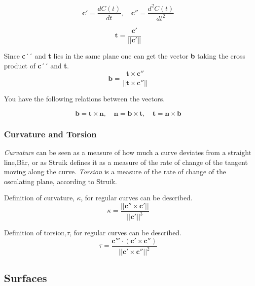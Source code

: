\begin{equation}
\textbf{c}' =  \frac{d C(t)}{dt}, \quad \textbf{c}''=   \frac{d^2 C(t)}{dt^2}
\end{equation}


\begin{equation}
\textbf{t} = \frac{\textbf{c}'}{||\textbf{c}'||} 
\end{equation}

Since \textbf{c}´´ and \textbf{t} lies in the same plane one can get the vector \textbf{b} taking the cross product of \textbf{c}´´ and \textbf{t}. 
\begin{equation}
\textbf{b} = \frac{\textbf{t} \times \textbf{c}''}{||\textbf{t} \times \textbf{c}''||} 
\end{equation}

You have the following relations between the vectors.

\begin{equation}
\textbf{b} = \textbf{t} \times \textbf{n} ,\quad \textbf{n} = \textbf{b} \times \textbf{t} ,\quad \textbf{t} = \textbf{n} \times \textbf{b} 
\end{equation}

\subsubsection{Curvature and Torsion} \label{curvature}

\textit{Curvature} can be seen as a measure of how much a curve deviates from a straight line,Bär, or as Struik defines it as a measure of the rate of change of the tangent moving along the curve. \textit{Torsion} is a measure of the rate of change of the osculating plane, according to Struik.

\vspace{5mm} %

Definition of curvature, $\kappa$, for regular curves can be described. 
\begin{equation}
\kappa = \frac{|| \textbf{c}'' \times \textbf{c}' ||}{||\textbf{c}'||^3} 
\end{equation}

Definition of torsion,$\tau$, for regular curves can be described. 
\begin{equation}
\tau = \frac{ \textbf{c}''' \cdot(\textbf{c}' \times \textbf{c}'')}{||\textbf{c}' \times \textbf{c}''||^2} 
\end{equation}

\subsection{Surfaces}

